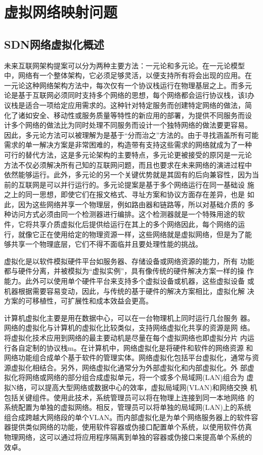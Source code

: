 \chapter{虚拟网络映射问题}
\section{SDN网络虚拟化概述}
未来互联网架构提案可以分为两种主要方法：一元论和多元论。在一元论模型 中，网络有一个整体架构，它必须足够灵活，以便支持所有将会出现的应用。在 一元论这种网络架构方法中，每次仅有一个协议栈运行在物理基层之上。而多元 论是基于互联网必须同时支持多个网络的思想，每个网络都会运行协议栈，该I办 议栈是适合一项给定应用需求的。这种针对特定服务而创建特定网络的做法，简 化了诸如安全、移动性或服务质量等特性的新应用的部署，为提供不同服务而设 计多个网络的做法比为同时处理不同服务而设计一个独特网络的做法要更容易。 因此，多元论方法可以被理解为是基于“分而治之”方法的。由于寻找涵盖所有可能 需求的单一解决方案是非常困难的，构造带有支持这些需求的网络就成为了一种 可行的替代方法，这是多元论架构的主要特点，多元论更被接受的原冈是一元论 方法不仅必须解决所有己知的互联网问题，而且也要求在未来网络的演进过程中 依然能够运行。此外，多元论的另一个关键优势就是其固有的后向兼容性，因为当前的互联网是可以并行运行的。多元论提案是基于多个网络运行在同一基础设 施之上的同一思想，即使它们在报文格式、寻址方案和协议方面存在差异，也是 如此，因为这些网络丼享一个物理层，例如路由器和链路等，所以对基础介质的 多种访问方式必须由同一个检测器进行编排。这个检测器就是一个特殊用途的软 件，它将共享介质虚拟化后提供给运行在其上的多个网络因此，每个网络的运 行，就像它正在使用给定的物理资源一样，这些网络就是虚拟网络，但是为了能 够共享一个物理底层，它们不得不面临并且要处理性能的挑战。

虚拟化是以软件模拟硬件平台如服务器、存储设备或网络资源的能力，所有 功能都与硬件分离，并被模拟为“虚拟实例”，具有像传统的硬件解决方案一样的操 作能力。此外可以使用单个硬件平台来支持多个虚拟设备或机器，这些虚拟设备 或机器根据需要容易变动，因此，与传统的基于硬件的解决方案相比，虚拟化解 决方案的可移植性，可扩展性和成本效益会更高。

计算机虚拟化主要是用在数据中心，可以在一台物理机上同时运行几台服务 器。网络的虚拟化与计算机的虚拟化比较类似，支持网络虚拟化共享的资源是网 络。将虚拟化技术应用到网络的最主要动机是尽量在每个虚拟网络也即虚拟分片 内运行各自定制的协议栈m。在计算机中，网络虚拟化是将硬件和软件的网络资源 和网络功能组合成单个基于软件的管理实体。网络虚拟化包括平台虚拟化，通常与资源虚拟化相结合。另外，网络虚拟化通常分为外部虚拟化和内部虚拟化。外 部虚拟化将网络或网络的部分组合成虚拟单元，将一个或多个局域网(LAN)组合为 虚拟N络，可以提高大型网络或数据中心的效率，虚拟局域网(VLAN)和网络交换 机包括关键组件。使用此技术，系统管理员可以将在物理上连接到同一本地网络 的系统配置为单独的虚拟网络。相反，管理员可以将单独的局域网(LAN)上的系统 组合成跨越大网络段的单个VLAN。而内部虚拟化是为单个网络服务器上的软件容 器提供类似网络的功能，使用软件容器或伪接口配置单个系统，以使用软件仿真 物理网络，这可以通过将应用程序隔离到单独的容器或伪接口来提高单个系统的 效卓。

